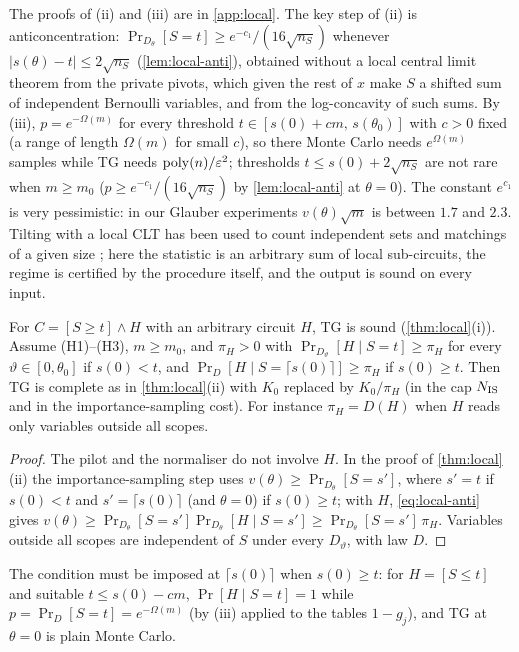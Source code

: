 The proofs of (ii) and (iii) are in \cref{app:local}. The key step of (ii) is
anticoncentration: $\Pr_{D_\theta}[S=t]\ge e^{-c_1}/(16\sqrt{n_S})$ whenever
$|s(\theta)-t|\le2\sqrt{n_S}$ (\cref{lem:local-anti}), obtained without a local central limit
theorem from the private pivots, which given the rest of $x$ make $S$ a shifted sum of
independent Bernoulli variables, and from the log-concavity of such sums. By (iii),
$p=e^{-\Omega(m)}$ for every threshold $t\in[s(0)+cm,\,s(\theta_0)]$ with $c>0$ fixed (a
range of length $\Omega(m)$ for small $c$), so there Monte Carlo needs $e^{\Omega(m)}$
samples while TG needs $\mathrm{poly}(n)/\varepsilon^2$; thresholds $t\le s(0)+2\sqrt{n_S}$ are not rare when
$m\ge m_0$ ($p\ge e^{-c_1}/(16\sqrt{n_S})$ by \cref{lem:local-anti} at $\theta=0$). The constant
$e^{c_1}$ is very pessimistic: in our Glauber experiments $v(\theta)\sqrt m$ is between
$1.7$ and $2.3$. Tilting with a local CLT has been used to count
independent sets and matchings of a given size
\cite{daviesperkins2021,jpss2021}; here the statistic is an arbitrary sum of local
sub-circuits, the regime is certified by the procedure itself, and the output is sound
on every input.

\begin{corollary}\label{cor:local-side}
For $C=[S\ge t]\wedge H$ with an arbitrary circuit $H$, TG is sound
(\cref{thm:local}(i)). Assume (H1)--(H3), $m\ge m_0$, and $\pi_H>0$ with
$\Pr_{D_\vartheta}[H\mid S=t]\ge\pi_H$ for every $\vartheta\in[0,\theta_0]$ if $s(0)<t$, and
$\Pr_D[H\mid S=\lceil s(0)\rceil]\ge\pi_H$ if $s(0)\ge t$. Then TG is complete as in
\cref{thm:local}(ii) with $K_0$ replaced by $K_0/\pi_H$ (in the cap $N_{\rm IS}$ and in the
importance-sampling cost). For instance $\pi_H=D(H)$ when $H$ reads only variables outside
all scopes.
\end{corollary}

\begin{proof}
The pilot and the normaliser do not involve $H$. In the proof of \cref{thm:local}(ii) the
importance-sampling step uses $v(\theta)\ge\Pr_{D_\theta}[S=s']$, where $s'=t$ if $s(0)<t$
and $s'=\lceil s(0)\rceil$ (and $\theta=0$) if $s(0)\ge t$; with $H$, \eqref{eq:local-anti} gives
$v(\theta)\ge\Pr_{D_\theta}[S=s']\Pr_{D_\theta}[H\mid S=s']\ge\Pr_{D_\theta}[S=s']\,\pi_H$. Variables
outside all scopes are independent of $S$ under every $D_\vartheta$, with law $D$.
\end{proof}

The condition must be imposed at $\lceil s(0)\rceil$ when $s(0)\ge t$: for $H=[S\le t]$ and
suitable $t\le s(0)-cm$, $\Pr[H\mid S=t]=1$ while $p=\Pr_D[S=t]=e^{-\Omega(m)}$ (by (iii)
applied to the tables $1-g_j$), and TG at $\theta=0$ is plain Monte Carlo.

